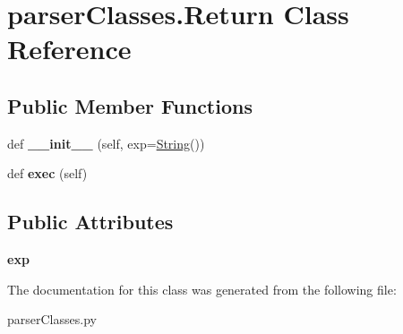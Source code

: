 \hypertarget{classparser_classes_1_1_return}{}\section{parser\+Classes.\+Return Class Reference}
\label{classparser_classes_1_1_return}
\subsection*{Public Member Functions}
\begin{DoxyCompactItemize}
\item 
\mbox{\label{classparser_classes_1_1_return_a3034474866e17be4742096ed2434b80d}} 
def {\bfseries \+\_\+\+\_\+init\+\_\+\+\_\+} (self, exp=\hyperlink{classparser_classes_1_1_string}{String}())
\item 
\mbox{\label{classparser_classes_1_1_return_a0d771079b3f705e980d25c2a4d3c9bd9}} 
def {\bfseries exec} (self)
\end{DoxyCompactItemize}
\subsection*{Public Attributes}
\begin{DoxyCompactItemize}
\item 
\mbox{\label{classparser_classes_1_1_return_a2b35e75cdff0a6fbd98f539a679e7848}} 
{\bfseries exp}
\end{DoxyCompactItemize}


The documentation for this class was generated from the following file\+:\begin{DoxyCompactItemize}
\item 
parser\+Classes.\+py\end{DoxyCompactItemize}
